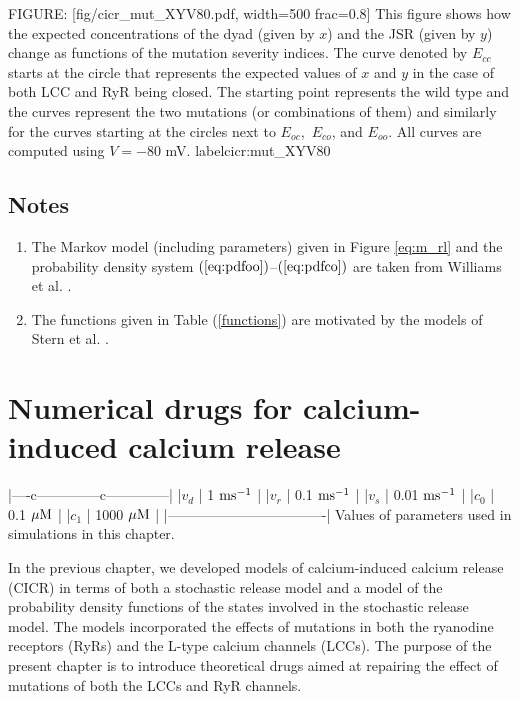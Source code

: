 FIGURE: [fig/cicr_mut_XYV80.pdf, width=500 frac=0.8] This figure shows how the expected concentrations of the dyad (given by $x$) and the JSR (given by $y$) change as functions of the mutation severity indices. The curve denoted by $E_{cc}$ starts at the circle that represents the expected values of $x$ and $y$ in the case of both LCC and RyR being closed. The starting point represents the wild type and the curves represent the two mutations (or combinations of them) and similarly for the curves starting at the circles next to $E_{oc}$,\, $E_{co}$, and $E_{oo}$. All curves are computed using $V=-80$ mV. label{cicr:mut_XYV80}

\section{Notes}

\begin{enumerate}
\item The Markov model  (including parameters)  given in Figure \ref{eq:m_rl} and the probability density system  $(  \ref{eq:pdfoo})$--$(\ref{eq:pdfco})  $
 are taken from Williams et al. \cite{Williams2007}.
\item The functions given in Table (\ref{functions}) are motivated by the models of Stern et al. \cite{Stern1999}.
\end{enumerate}

\chapter[Numerical drugs for CICR]{Numerical drugs for calcium-induced calcium release}

|----c--------------c--------------|
|$v_d $ | 1 $\rm{ms^{-1}}$         |
|$v_r $ | 0.1 $\rm{ms^{-1}}$       |
|$v_s $ | 0.01 $\rm{ms^{-1}}$      |
|$c_0 $ | 0.1 $\rm{\mu M}$         |
|$c_1 $ | 1000 $\rm{\mu M}$        |
|----------------------------------|
Values of parameters used in simulations in this chapter.
\label{tab:cicr_again}


In the previous chapter, we developed models of calcium-induced calcium release (CICR) in terms of both a stochastic release model and a model of the probability density functions of the states involved in the stochastic release model. The models incorporated the effects of mutations in both the ryanodine receptors (RyRs) and the L-type calcium channels (LCCs).
The purpose of the present chapter is to introduce theoretical drugs aimed at repairing the effect of mutations of both the LCCs and RyR channels.

